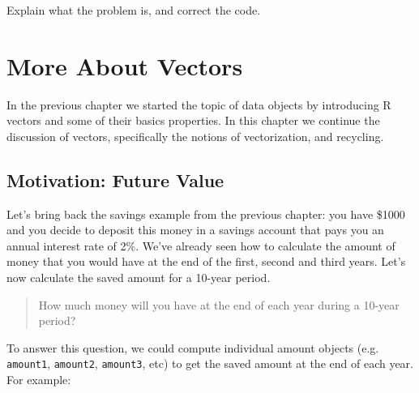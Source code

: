 \documentclass[
]{book}
\begin{document}
Explain what the problem is, and correct the code.

\hypertarget{more-about-vectors}{%
\chapter{More About Vectors}\label{more-about-vectors}}

In the previous chapter we started the topic of data objects by introducing
R vectors and some of their basics properties. In this chapter we continue the
discussion of vectors, specifically the notions of vectorization, and
recycling.

\hypertarget{motivation-future-value}{%
\section{Motivation: Future Value}\label{motivation-future-value}}

Let's bring back the savings example from the previous chapter: you have \$1000
and you decide to deposit this money in a savings account that pays you an
annual interest rate of 2\%. We've already seen how to calculate the amount of
money that you would have at the end of the first, second and third years. Let's
now calculate the saved amount for a 10-year period.

\begin{quote}
How much money will you have at the end of each year during a 10-year period?
\end{quote}

To answer this question, we could compute individual amount objects (e.g.~
\texttt{amount1}, \texttt{amount2}, \texttt{amount3}, etc) to get the saved amount at the end of
each year. For example:
\end{document}
